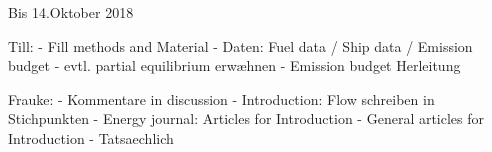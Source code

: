 Bis 14.Oktober 2018

Till:
- Fill methods and Material
- Daten: Fuel data / Ship data / Emission budget
- evtl. partial equilibrium erwæhnen
- Emission budget Herleitung

Frauke:
- Kommentare in discussion
- Introduction: Flow schreiben in Stichpunkten
- Energy journal: Articles for Introduction
- General articles for Introduction
- Tatsaechlich
